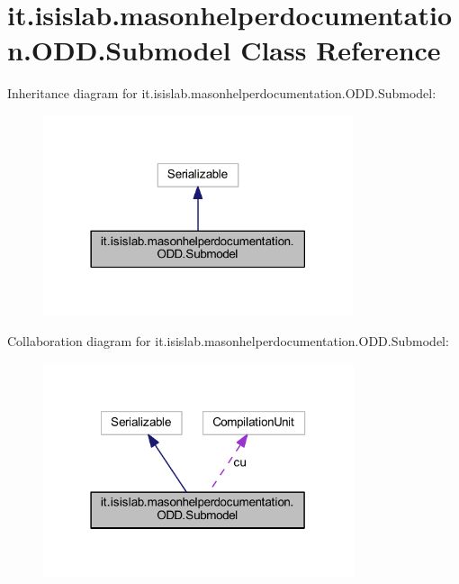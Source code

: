 \hypertarget{classit_1_1isislab_1_1masonhelperdocumentation_1_1_o_d_d_1_1_submodel}{\section{it.\-isislab.\-masonhelperdocumentation.\-O\-D\-D.\-Submodel Class Reference}
\label{classit_1_1isislab_1_1masonhelperdocumentation_1_1_o_d_d_1_1_submodel}
}


Inheritance diagram for it.\-isislab.\-masonhelperdocumentation.\-O\-D\-D.\-Submodel\-:\nopagebreak
\begin{figure}[H]
\begin{center}
\leavevmode
\includegraphics[width=258pt]{classit_1_1isislab_1_1masonhelperdocumentation_1_1_o_d_d_1_1_submodel__inherit__graph}
\end{center}
\end{figure}


Collaboration diagram for it.\-isislab.\-masonhelperdocumentation.\-O\-D\-D.\-Submodel\-:\nopagebreak
\begin{figure}[H]
\begin{center}
\leavevmode
\includegraphics[width=259pt]{classit_1_1isislab_1_1masonhelperdocumentation_1_1_o_d_d_1_1_submodel__coll__graph}
\end{center}
\end{figure}
